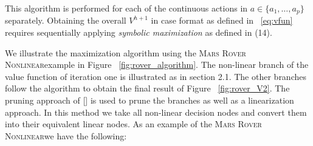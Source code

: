 \documentclass[letterpaper]{article}
\newcommand{\MarsRoverNL}{\textsc{Mars Rover Nonlinear}}
\begin{document}
\begin{enumerate}
This algorithm is performed for each of the continuous actions in $a \in \{a_1,\ldots,a_p\}$ separately. Obtaining the overall $V^{h+1}$ in case format as defined in ~\eqref{eq:vfun} requires sequentially applying \emph{symbolic maximization} as defined in (14).
\end{enumerate}

We illustrate the maximization algorithm using the \MarsRoverNL example in Figure ~\ref{fig:rover_algorithm}. The non-linear branch of the value function of iteration one is illustrated as in section 2.1. 
The other branches follow the algorithm to obtain the final result of Figure ~\ref{fig:rover_V2}. The pruning approach of [] is used to prune the branches as well as a linearization approach. In this method we take all non-linear decision nodes and convert them into their equivalent linear nodes. As an example of the \MarsRoverNL we have the following:
\end{document}
